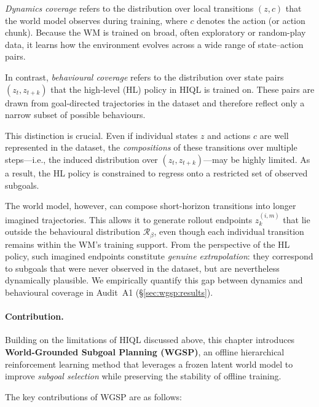 \emph{Dynamics coverage} refers to the distribution over local
transitions $(z, c)$ that the world model observes during training,
where $c$ denotes the action (or action chunk). Because the WM is
trained on broad, often exploratory or random-play data, it learns how
the environment evolves across a wide range of state--action pairs.

In contrast, \emph{behavioural coverage} refers to the distribution over
state pairs $(z_t, z_{t+k})$ that the high-level (HL) policy in HIQL is
trained on. These pairs are drawn from goal-directed trajectories in
the dataset and therefore reflect only a narrow subset of possible
behaviours.

This distinction is crucial. Even if individual states $z$ and actions
$c$ are well represented in the dataset, the \emph{compositions} of
these transitions over multiple steps—i.e., the induced distribution
over $(z_t, z_{t+k})$—may be highly limited. As a result, the HL policy
is constrained to regress onto a restricted set of observed subgoals.

The world model, however, can compose short-horizon transitions into
longer imagined trajectories. This allows it to generate rollout
endpoints $z_k^{(i,m)}$ that lie outside the behavioural distribution
$\mathcal{R}_\beta$, even though each individual transition remains
within the WM's training support. From the perspective of the HL
policy, such imagined endpoints constitute \emph{genuine extrapolation}:
they correspond to subgoals that were never observed in the dataset,
but are nevertheless dynamically plausible. We empirically quantify
this gap between dynamics and behavioural coverage in
Audit~A1 (\S\ref{sec:wgsp:results}).

\paragraph{Contribution.}
Building on the limitations of HIQL discussed above, this chapter
introduces \textbf{World-Grounded Subgoal Planning (WGSP)}, an offline
hierarchical reinforcement learning method that leverages a frozen
latent world model to improve \emph{subgoal selection} while preserving
the stability of offline training.

The key contributions of WGSP are as follows:

